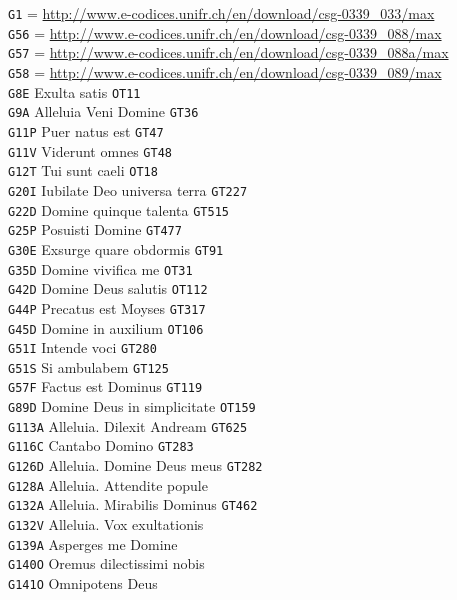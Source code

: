 \documentclass[a4paper]{article}
\begin{document}
{\begin{multicols}{2}
\noindent
\texttt{G1} = \url{http://www.e-codices.unifr.ch/en/download/csg-0339_033/max}\\
\texttt{G56} = \url{http://www.e-codices.unifr.ch/en/download/csg-0339_088/max}\\
\texttt{G57} = \url{http://www.e-codices.unifr.ch/en/download/csg-0339_088a/max}\\
\texttt{G58} = \url{http://www.e-codices.unifr.ch/en/download/csg-0339_089/max}\\
\texttt{G8E} Exulta satis \texttt{OT11}\\
\texttt{G9A} Alleluia Veni Domine \texttt{GT36}\\
\texttt{G11P} Puer natus est \texttt{GT47}\\
\texttt{G11V} Viderunt omnes \texttt{GT48}\\
\texttt{G12T} Tui sunt caeli \texttt{OT18}\\
\texttt{G20I} Iubilate Deo universa terra \texttt{GT227}\\
\texttt{G22D} Domine quinque talenta \texttt{GT515}\\
\texttt{G25P} Posuisti Domine \texttt{GT477}\\
\texttt{G30E} Exsurge quare obdormis \texttt{GT91}\\
\texttt{G35D} Domine vivifica me \texttt{OT31}\\
\texttt{G42D} Domine Deus salutis \texttt{OT112}\\
\texttt{G44P} Precatus est Moyses \texttt{GT317}\\
\texttt{G45D} Domine in auxilium \texttt{OT106}\\
\texttt{G51I} Intende voci \texttt{GT280}\\
\texttt{G51S} Si ambulabem \texttt{GT125}\\
\texttt{G57F} Factus est Dominus \texttt{GT119}\\
\texttt{G89D} Domine Deus in simplicitate \texttt{OT159}\\
\texttt{G113A} Alleluia. Dilexit Andream \texttt{GT625}\\
\texttt{G116C} Cantabo Domino \texttt{GT283}\\
\texttt{G126D} Alleluia. Domine Deus meus \texttt{GT282}\\
\texttt{G128A} Alleluia. Attendite popule\\
\texttt{G132A} Alleluia. Mirabilis Dominus \texttt{GT462}\\
\texttt{G132V} Alleluia. Vox exultationis\\
\texttt{G139A} Asperges me Domine\\
\texttt{G140O} Oremus dilectissimi nobis\\
\texttt{G141O} Omnipotens Deus


\end{multicols}}
\end{document}
